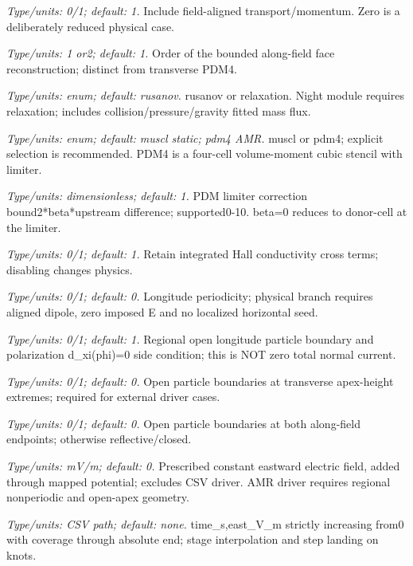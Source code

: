 \begin{description}[style=nextline,leftmargin=0pt,labelindent=0pt,labelwidth=0pt,labelsep=0pt]
\item[\texttt{--parallel}] \textit{Type/units: 0/1; default: 1.} Include field-aligned transport/momentum. Zero is a deliberately reduced physical case.
\item[\texttt{--parallel-order}] \textit{Type/units: 1 or2; default: 1.} Order of the bounded along-field face reconstruction; distinct from transverse PDM4.
\item[\texttt{--parallel-flux}] \textit{Type/units: enum; default: rusanov.} rusanov or relaxation. Night module requires relaxation; includes collision/pressure/gravity fitted mass flux.
\item[\texttt{--exb-scheme}] \textit{Type/units: enum; default: muscl static; pdm4 AMR.} muscl or pdm4; explicit selection is recommended. PDM4 is a four-cell volume-moment cubic stencil with limiter.
\item[\texttt{--pdm-beta}] \textit{Type/units: dimensionless; default: 1.} PDM limiter correction bound2*beta*upstream difference; supported0-10. beta=0 reduces to donor-cell at the limiter.
\item[\texttt{--hall}] \textit{Type/units: 0/1; default: 1.} Retain integrated Hall conductivity cross terms; disabling changes physics.
\item[\texttt{--periodic-x}] \textit{Type/units: 0/1; default: 0.} Longitude periodicity; physical branch requires aligned dipole, zero imposed E and no localized horizontal seed.
\item[\texttt{--regional-x}] \textit{Type/units: 0/1; default: 1.} Regional open longitude particle boundary and polarization d\_xi(phi)=0 side condition; this is NOT zero total normal current.
\item[\texttt{--open-apex}] \textit{Type/units: 0/1; default: 0.} Open particle boundaries at transverse apex-height extremes; required for external driver cases.
\item[\texttt{--open-ends}] \textit{Type/units: 0/1; default: 0.} Open particle boundaries at both along-field endpoints; otherwise reflective/closed.
\item[\texttt{--background-east-mVm}] \textit{Type/units: mV/m; default: 0.} Prescribed constant eastward electric field, added through mapped potential; excludes CSV driver. AMR driver requires regional nonperiodic and open-apex geometry.
\item[\texttt{--electric-driver}] \textit{Type/units: CSV path; default: none.} time\_s,east\_V\_m strictly increasing from0 with coverage through absolute end; stage interpolation and step landing on knots.

\end{description}
